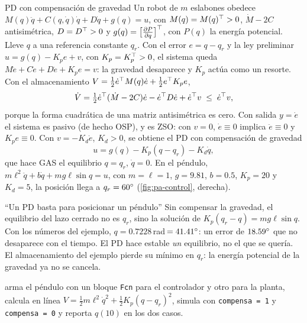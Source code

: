 \begin{ejemplo}[label=ej:pa-pendulo]{PD con compensación de gravedad \citep{TaAr81}}
Un robot de $m$ eslabones obedece $M(q)\ddot q+C(q,\dot q)\dot q+D\dot q+g(q)=u$, con $M(q)=M(q)^{\top}>0$, $\dot M-2C$ antisimétrica, $D=D^{\top}>0$ y $g(q)=\bigl[\frac{\partial P}{\partial q}\bigr]^{\top}$, con $P(q)$ la energía potencial. Lleve $q$ a una referencia constante $q_r$.
\solucion Con el error $e=q-q_r$ y la ley preliminar $u=g(q)-K_pe+v$, con $K_p=K_p^{\top}>0$, el sistema queda $M\ddot e+C\dot e+D\dot e+K_pe=v$: la gravedad desaparece y $K_p$ actúa como un resorte. Con el almacenamiento $V=\tfrac12\dot e^{\top} M(q)\dot e+\tfrac12e^{\top} K_pe$,
\[
  \dot V=\tfrac12\dot e^{\top}(\dot M-2C)\dot e-\dot e^{\top} D\dot e+\dot e^{\top} v\;\le\;\dot e^{\top} v ,
\]
porque la forma cuadrática de una matriz antisimétrica es cero. Con salida $y=\dot e$ el sistema es pasivo (de hecho OSP), y es ZSO: con $v=0$, $\dot e\equiv0$ implica $\ddot e\equiv0$ y $K_pe\equiv0$. Con $v=-K_d\dot e$, $K_d>0$, se obtiene el PD con compensación de gravedad
\[
  u=g(q)-K_p(q-q_r)-K_d\dot q ,
\]
que hace GAS el equilibrio $q=q_r$, $\dot q=0$. En el péndulo, $m\ell^2\ddot q+b\dot q+mg\ell\sin q=u$, con $m=\ell=1$, $g=9.81$, $b=0.5$, $K_p=20$ y $K_d=5$, la posición llega a $q_r=60^{\circ}$ (\cref{fig:pa-control}, derecha).
\end{ejemplo}

\begin{trampa}[label=tr:pa-pd]{``Un PD basta para posicionar un péndulo''}
Sin compensar la gravedad, el equilibrio del lazo cerrado no es $q_r$, sino la solución de $K_p(q_r-q)=mg\ell\sin q$. Con los números del ejemplo, $q=0.7228$\,rad$\,=41.41^{\circ}$: un error de $18.59^{\circ}$ que no desaparece con el tiempo. El PD hace estable \emph{un} equilibrio, no el que se quería. El almacenamiento del ejemplo pierde su mínimo en $q_r$: la energía potencial de la gravedad ya no se cancela.
\end{trampa}


\begin{modelo}
 arma el péndulo con un bloque \texttt{Fcn} para el controlador y otro para la planta, calcula en línea $V=\tfrac12m\ell^2\dot q^2+\tfrac12K_p(q-q_r)^2$, simula con \texttt{compensa = 1} y \texttt{compensa = 0} y reporta $q(10)$ en los dos casos.
\end{modelo}

